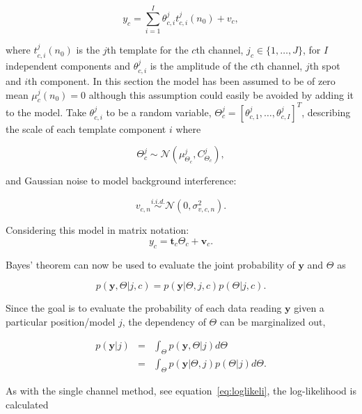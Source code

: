 \begin{equation}\label{eq:mod1_c}
y_c = \sum_{i=1}^{I} \theta_{c,i}^j t_{c,i}^j(n_0) + v_c,
\end{equation}

where $t_{c,i}^j(n_0)$ is the $j$th template for the $c$th channel, $j_c \in \{1, \ldots ,J\}$, for $I$ independent components and $\theta_{c,i}^j$ is the amplitude of the $c$th channel, $j$th spot and $i$th component. In this section the model has been assumed to be of zero mean $\mu_c^j(n_0) =0$ although this assumption could easily be avoided by adding it to the model. Take $\theta_{c,i}^j$ to be a random variable, $\Theta_c^j = [\theta_{c,1}^j,\ldots,\theta_{c,I}^j]^T$, describing the scale of each template component $i$ where

\begin{equation}\label{eq:theta_c}
\Theta_c^j \sim \mathcal{N}(\mu_{\Theta_c}^j,C_{\Theta_c}^j),
\end{equation}

and Gaussian noise to model background interference:

\begin{equation}\label{eq:noise_c}
v_{c,n} \stackrel{i.i.d.}{\sim} \mathcal{N}(0,\sigma_{v,c,n}^2).
\end{equation}

Considering this model in matrix notation:
\begin{equation}\label{eq:mod2}
y_c = \textbf{t}_c\Theta_c + \textbf{v}_c.
\end{equation}

Bayes' theorem can now be used to evaluate the joint probability of $\textbf{y}$ and $\Theta$ as

\begin{equation}\label{eq:bayes1_c}
p(\textbf{y},\Theta | j, c) = p(\textbf{y}|\Theta,j,c)p(\Theta | j,c).
\end{equation}

Since the goal is to evaluate the probability of each data reading $\textbf{y}$ given a particular position/model $j$, the dependency of $\Theta$ can be marginalized out,

\begin{eqnarray}\nonumber
p(\textbf{y}|j) &=& \int_\Theta p(\textbf{y},\Theta|j) d\Theta \\
\label{eq:marg1_c} &=& \int_\Theta p(\textbf{y}|\Theta,j)p(\Theta|j) d\Theta.
\end{eqnarray}

As with the single channel method, see equation~\ref{eq:loglikeli}, the log-likelihood is calculated

